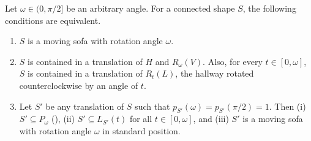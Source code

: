 \begin{theorem}

Let \(\omega \in (0, \pi/2]\) be an arbitrary angle. For a connected shape \(S\), the following conditions are equivalent.

\begin{enumerate}
\def\labelenumi{\arabic{enumi}.}
\tightlist
\item
  \(S\) is a moving sofa with rotation angle \(\omega\).
\item
  \(S\) is contained in a translation of \(H\) and \(R_\omega(V)\). Also, for every \(t \in [0, \omega]\), \(S\) is contained in a translation of \(R_t(L)\), the hallway rotated counterclockwise by an angle of \(t\).
\item
  Let \(S'\) be any translation of \(S\) such that \(p_{S'}(\omega) = p_{S'}(\pi/2) = 1\). Then (i) \(S' \subseteq P_\omega\) (), (ii) \(S' \subseteq L_{S'}(t)\) for all \(t \in [0, \omega]\), and (iii) \(S'\) is a moving sofa with rotation angle \(\omega\) in standard position.
\end{enumerate}

\label{thm:moving-sofa-iff-hallway-intersection}
\end{theorem}

